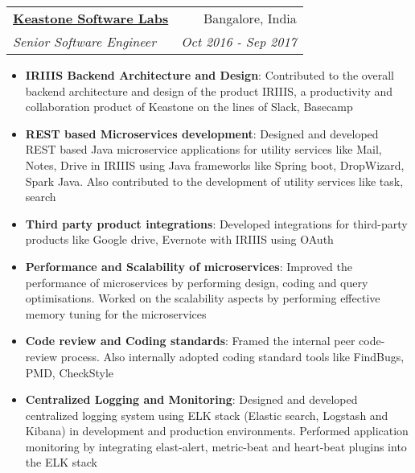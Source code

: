 \documentclass[letterpaper,11pt]{article}
\makeatletter
\newcommand{\resumeItem}[2]{
  \item\small{
    \textbf{#1}{: #2 \vspace{-2pt}}
  }
}
\newcommand{\resumeSubheading}[4]{
  \vspace{-1pt}\item
    \begin{tabular*}{0.97\textwidth}{l@{\extracolsep{\fill}}r}
      \textbf{#1} & #2 \\
      \textit{\small#3} & \textit{\small #4} \\
    \end{tabular*}\vspace{-5pt}
}
\newcommand{\resumeItemListStart}{\begin{itemize}}
\newcommand{\resumeItemListEnd}{\end{itemize}\vspace{-5pt}}
\makeatother
\begin{document}
    \resumeSubheading
      {\href{http://www.keastone.com/}{Keastone Software Labs}}{Bangalore, India}
      {Senior Software Engineer}{Oct 2016 - Sep 2017}
      \resumeItemListStart
          \resumeItem{IRIIIS Backend Architecture and Design}
          {Contributed to the overall backend architecture and design of the product IRIIIS, a productivity and collaboration product of Keastone on the lines of Slack, Basecamp }
          \resumeItem{REST based Microservices development}
          {Designed and developed REST based Java microservice applications for utility services like Mail, Notes, Drive in IRIIIS using Java frameworks like Spring boot, DropWizard, Spark Java. Also contributed to the development of utility services like task, search }
          \resumeItem{Third party product integrations}
          {Developed integrations for third-party products like Google drive, Evernote with IRIIIS using OAuth}
          \resumeItem{Performance and Scalability of microservices}
          {Improved the performance of microservices by performing design, coding and query optimisations. Worked on the scalability aspects by performing effective memory tuning for the microservices}
          \resumeItem{Code review and Coding standards}
          {Framed the internal peer code-review process. Also internally adopted coding standard tools like FindBugs, PMD, CheckStyle}
           \resumeItem{Centralized Logging and Monitoring}
          {Designed and developed centralized logging system using ELK stack (Elastic search, Logstash and Kibana) in development and production environments. Performed application monitoring by integrating elast-alert, metric-beat and heart-beat plugins into the ELK stack}
      \resumeItemListEnd
\end{document}
